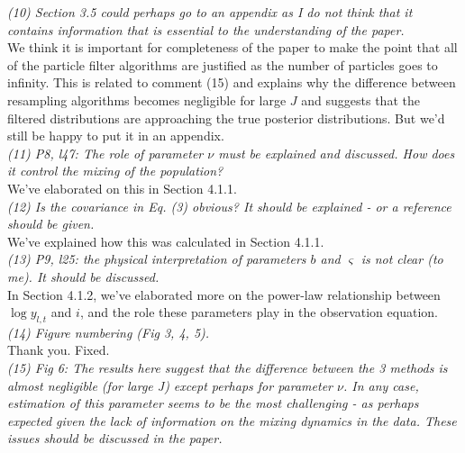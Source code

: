 \documentclass{article}
\begin{document}
\noindent \emph{(10) Section 3.5 could perhaps go to an appendix as I do not think that it contains information that is essential to the understanding of the paper.} \\

We think it is important for completeness of the paper to make the point that all of the particle filter algorithms are justified as the number of particles goes to infinity. This is related to comment (15) and explains why the difference between resampling algorithms becomes negligible for large $J$ and suggests that the filtered distributions are approaching the true posterior distributions. But we'd still be happy to put it in an appendix. \\

\noindent \emph{(11) P8, l47: The role of parameter $\nu$ must be explained and discussed. How does it control the mixing of the population?} \\

We've elaborated on this in Section 4.1.1. \\

\noindent \emph{(12) Is the covariance in Eq. (3) obvious? It should be explained - or a reference should be given.} \\

We've explained how this was calculated in Section 4.1.1. \\

\noindent \emph{(13) P9, l25: the physical interpretation of parameters $b$ and $\varsigma$ is not clear (to me). It should be discussed.} \\

In Section 4.1.2, we've elaborated more on the power-law relationship between $\log y_{l,t}$ and $i$, and the role these parameters play in the observation equation. \\

\noindent \emph{(14) Figure numbering (Fig 3, 4, 5).} \\

Thank you. Fixed. \\

\noindent \emph{(15) Fig 6: The results here suggest that the difference between the 3 methods is almost negligible (for large J) except perhaps for parameter $\nu$. In any case, estimation of this parameter seems to be the most challenging - as perhaps expected given the lack of information on the mixing dynamics in the data. These issues should be discussed in the paper.} \\
\end{document}
